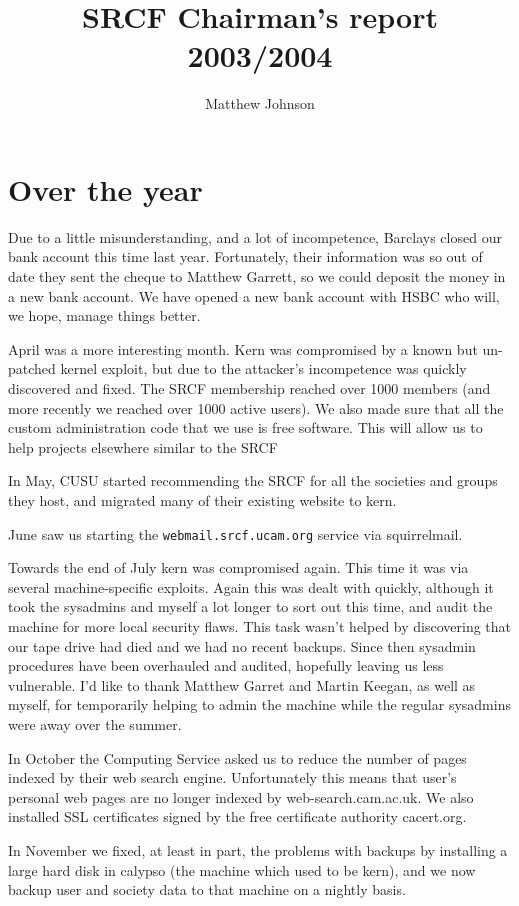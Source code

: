 \documentclass[a4paper, 12pt]{report}
\title{SRCF Chairman's report 2003/2004}
\author{Matthew Johnson}
\begin{document}
\setcounter{secnumdepth}{-1}

\section{Over the year}

Due to a little misunderstanding, and a lot of incompetence, Barclays closed our bank account this time last year. Fortunately, their information was so out of date they sent the cheque to Matthew Garrett, so we could deposit the money in a new bank account. We have opened a new bank account with HSBC who will, we hope, manage things better.

April was a more interesting month. Kern was compromised by a known but un-patched kernel exploit, but due to the attacker's incompetence was quickly discovered and fixed. The SRCF membership reached over 1000 members (and more recently we reached over 1000 active users). We also made sure that all the custom administration code that we use is free software. This will allow us to help projects elsewhere similar to the SRCF

In May, CUSU started recommending the SRCF for all the societies and groups they host, and migrated many of their existing website to kern.

June saw us starting the {\tt webmail.srcf.ucam.org} service via squirrelmail.

Towards the end of July kern was compromised again. This time it was via several machine-specific exploits. Again this was dealt with quickly, although it took the sysadmins and myself a lot longer to sort out this time, and audit the machine for more local security flaws. This task wasn't helped by discovering that our tape drive had died and we had no recent backups. Since then sysadmin procedures have been overhauled and audited, hopefully leaving us less vulnerable. I'd like to thank Matthew Garret and Martin Keegan, as well as myself, for temporarily helping to admin the machine while the regular sysadmins were away over the summer.

In October the Computing Service asked us to reduce the number of pages indexed by their web search engine. Unfortunately this means that user's personal web pages are no longer indexed by web-search.cam.ac.uk. We also installed SSL certificates signed by the free certificate authority cacert.org.

In November we fixed, at least in part, the problems with backups by installing a large hard disk in calypso (the machine which used to be kern), and we now backup user and society data to that machine on a nightly basis.
\end{document}
